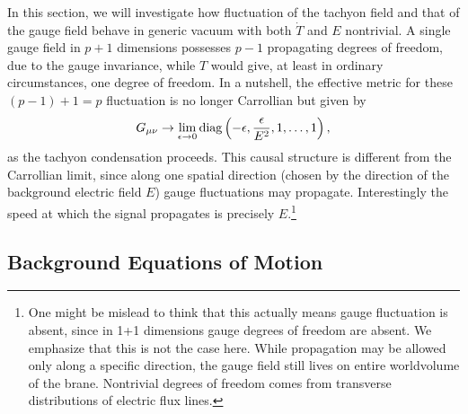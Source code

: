 \documentclass[a4paper,12pt]{article}
\begin{document}
In this section, we will investigate how fluctuation of the 
tachyon field and that of the gauge field behave in generic 
vacuum with both $\dot T$ and $E$ nontrivial. A single gauge
field in $p+1$ dimensions possesses $p-1$ propagating degrees
of freedom, due to the gauge invariance, while $T$ would give,
at least in ordinary circumstances, one degree of freedom.
In a nutshell, the effective metric for these $(p-1)+1=p$
fluctuation is no longer Carrollian but given by 
\begin{equation}
G_{\mu \nu} \rightarrow \lim_{\epsilon\rightarrow 0} {\rm diag }
\left(-\epsilon,\frac{\epsilon}{E^2},1, \dots, 1 \right),
\label{difca}
\end{equation} 
as the tachyon condensation proceeds. This causal structure is different
from the Carrollian limit, since along one spatial direction (chosen by
the direction of the background electric field $E$) gauge fluctuations
may propagate. Interestingly the speed at which the signal propagates 
is precisely $E$.\footnote{ One might be mislead to think that this
actually means gauge fluctuation is absent, since  in 1+1 dimensions
gauge degrees of freedom are absent. We emphasize that this is not the
case here. While propagation may be allowed only along a specific
direction, the gauge field still lives on entire worldvolume of the
brane. Nontrivial degrees of freedom comes from transverse distributions
of electric flux lines.}




\subsection{Background Equations of Motion}
\end{document}
